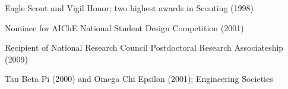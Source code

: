 Eagle Scout and Vigil Honor; two highest awards in Scouting (1998)

Nominee for AIChE National Student Design Competition (2001)

Recipient of National Research Council Postdoctoral Research Associateship (2009)

Tau Beta Pi (2000) and Omega Chi Epsilon (2001); Engineering Societies

